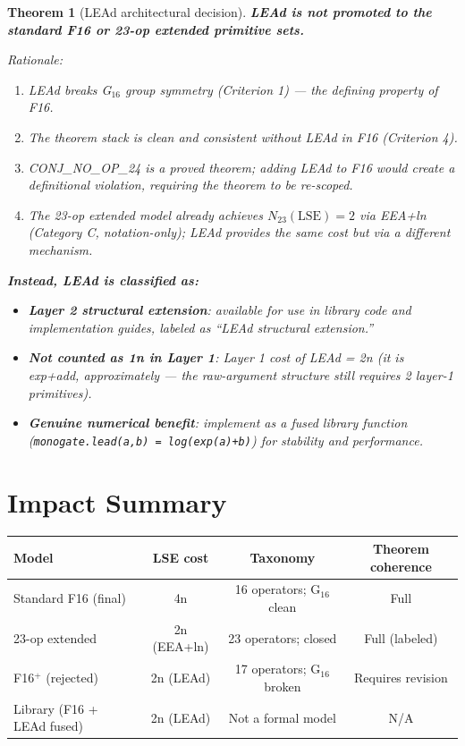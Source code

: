 \documentclass[11pt]{article}
\newtheorem{theorem}{Theorem}
\begin{document}
\begin{theorem}[LEAd architectural decision]
\label{thm:decision}
\textbf{LEAd is not promoted to the standard F16 or 23-op extended primitive sets.}

Rationale:
\begin{enumerate}
  \item LEAd breaks G$_{16}$ group symmetry (Criterion 1) — the defining property of F16.
  \item The theorem stack is clean and consistent without LEAd in F16 (Criterion 4).
  \item CONJ\_NO\_OP\_24 is a proved theorem; adding LEAd to F16 would create a
    definitional violation, requiring the theorem to be re-scoped.
  \item The 23-op extended model already achieves $N_{23}(\mathrm{LSE}) = 2$ via
    EEA+ln (Category C, notation-only); LEAd provides the same cost but via a
    different mechanism.
\end{enumerate}

\textbf{Instead, LEAd is classified as:}
\begin{itemize}
  \item \textbf{Layer 2 structural extension}: available for use in library code
    and implementation guides, labeled as ``LEAd structural extension.''
  \item \textbf{Not counted as 1n in Layer 1}: Layer 1 cost of LEAd = 2n
    (it is exp+add, approximately — the raw-argument structure still requires 2 layer-1 primitives).
  \item \textbf{Genuine numerical benefit}: implement as a fused library function
    (\texttt{monogate.lead(a,b) = log(exp(a)+b)}) for stability and performance.
\end{itemize}
\end{theorem}

\section{Impact Summary}

\begin{center}
\renewcommand{\arraystretch}{1.2}
\begin{tabular}{lccc}
\toprule
Model & LSE cost & Taxonomy & Theorem coherence \\
\midrule
Standard F16 (final) & 4n & 16 operators; G$_{16}$ clean & Full \\
23-op extended & 2n (EEA+ln) & 23 operators; closed & Full (labeled) \\
F16$^+$ (rejected) & 2n (LEAd) & 17 operators; G$_{16}$ broken & Requires revision \\
Library (F16 + LEAd fused) & 2n (LEAd) & Not a formal model & N/A \\
\bottomrule
\end{tabular}
\end{center}
\end{document}
